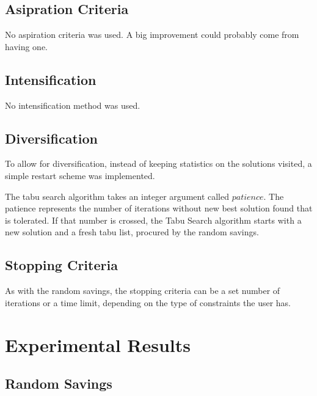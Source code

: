 \documentclass{article} %
\begin{document}
\subsection{Asipration Criteria}
No aspiration criteria was used. A big improvement could probably come from having one.


\subsection{Intensification}
No intensification method was used.


\subsection{Diversification}

To allow for diversification, instead of keeping statistics on the solutions visited, a simple restart scheme was implemented.\newline

The tabu search algorithm takes an integer argument called $patience$. The patience represents the number of iterations without new best solution found that is tolerated. If that number is crossed, the Tabu Search algorithm starts with a new solution and a fresh tabu list, procured by the random savings.


\subsection{Stopping Criteria}

As with the random savings, the stopping criteria can be a set number of iterations or a time limit, depending on the type of constraints the user has.


\newpage
\section{Experimental Results}
\label{exp_results}

\subsection{Random Savings}
\end{document}
